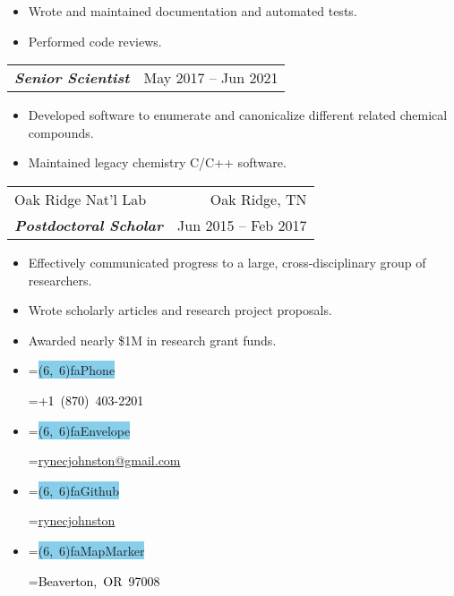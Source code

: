 \documentclass[12pt,letter,academicons]{article}
\newcommand*{\vcenteredhbox}[1]{\begingroup\setbox0=\hbox{#1}\parbox{\wd0}{\box0}\endgroup}
\newcommand{\icon}[3]{%
	\vcenteredhbox{\colorbox{skyblue}{\makebox(#2, #2){\textcolor{oceanblue}{\normalsize\csname fa#1\endcsname}}}}%
	\hspace{0.35cm}%
	\vcenteredhbox{\textcolor{black}{#3}}%
}
\begin{document}
\begin{multicols}{2}
\begin{small}
\begin{itemize}
    \item Wrote and maintained documentation and automated tests.
    \item Performed code reviews.
\end{itemize}
\begin{tabularx} {\columnwidth}{@{} L R @{}}
    \\[-6pt]\textbf{\textit{Senior Scientist}} & May 2017 -- Jun 2021\\
\end{tabularx}
\begin{itemize}
    \item Developed software to enumerate and canonicalize different related chemical compounds.
    \item Maintained legacy chemistry C/C++ software.
\end{itemize}
\begin{tabularx} {\columnwidth}{@{} L R @{}}
    \\[-6pt]Oak Ridge Nat'l Lab & Oak Ridge, TN\\
    \textbf{\textit{Postdoctoral Scholar}} & Jun 2015 -- Feb 2017\\
\end{tabularx}
\begin{itemize}
    \item Effectively communicated progress to a large, cross-disciplinary group of researchers.
    \item Wrote scholarly articles and research project proposals.
    \item Awarded nearly \$1M in research grant funds.
\end{itemize}

\columnbreak

\begin{mybox}
    \begin{itemize}[nosep, after=\strut, leftmargin=0pt, itemsep=3pt, label={}]
        \item \icon{Phone}{6}{+1 (870) 403-2201}
        \item \icon{Envelope}{6}{\href{mailto://ryne.c.johnston@gmail.com}{rynecjohnston@gmail.com}}
        \item \icon{Github}{6}{\href{https://github.com/rynecjohnston}{rynecjohnston}}
        \item \icon{MapMarker}{6} {Beaverton, OR 97008}
    \end{itemize}
\end{mybox}

\vspace*{-8pt}

\end{small}
\end{multicols}
\end{document}
